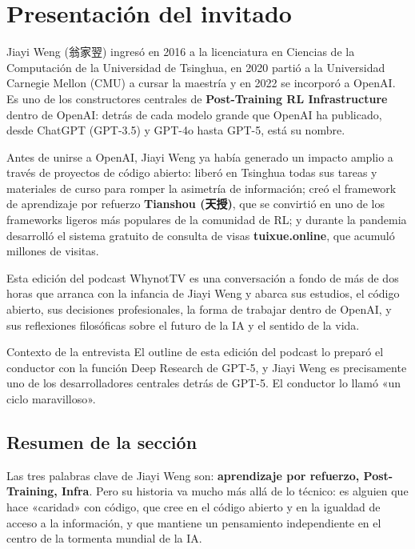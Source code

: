 \section{Presentación del invitado}

Jiayi Weng (翁家翌) ingresó en 2016 a la licenciatura en Ciencias de la Computación de la Universidad de Tsinghua, en 2020 partió a la Universidad Carnegie Mellon (CMU) a cursar la maestría y en 2022 se incorporó a OpenAI. Es uno de los constructores centrales de \textbf{Post-Training RL Infrastructure} dentro de OpenAI: detrás de cada modelo grande que OpenAI ha publicado, desde ChatGPT (GPT-3.5) y GPT-4o hasta GPT-5, está su nombre.

Antes de unirse a OpenAI, Jiayi Weng ya había generado un impacto amplio a través de proyectos de código abierto: liberó en Tsinghua todas sus tareas y materiales de curso para romper la asimetría de información; creó el framework de aprendizaje por refuerzo \textbf{Tianshou (天授)}, que se convirtió en uno de los frameworks ligeros más populares de la comunidad de RL; y durante la pandemia desarrolló el sistema gratuito de consulta de visas \textbf{tuixue.online}, que acumuló millones de visitas.

Esta edición del podcast WhynotTV es una conversación a fondo de más de dos horas que arranca con la infancia de Jiayi Weng y abarca sus estudios, el código abierto, sus decisiones profesionales, la forma de trabajar dentro de OpenAI, y sus reflexiones filosóficas sobre el futuro de la IA y el sentido de la vida.

\begin{knowledgebox}{Contexto de la entrevista}
El outline de esta edición del podcast lo preparó el conductor con la función Deep Research de GPT-5, y Jiayi Weng es precisamente uno de los desarrolladores centrales detrás de GPT-5. El conductor lo llamó «un ciclo maravilloso».
\end{knowledgebox}

\subsection{Resumen de la sección}

Las tres palabras clave de Jiayi Weng son: \textbf{aprendizaje por refuerzo, Post-Training, Infra}. Pero su historia va mucho más allá de lo técnico: es alguien que hace «caridad» con código, que cree en el código abierto y en la igualdad de acceso a la información, y que mantiene un pensamiento independiente en el centro de la tormenta mundial de la IA.

